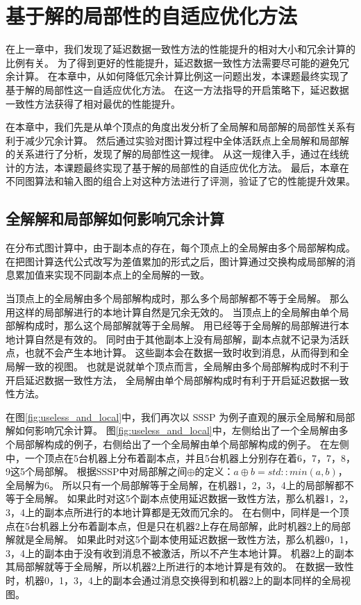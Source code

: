 \chapter{基于解的局部性的自适应优化方法}
在上一章中，我们发现了延迟数据一致性方法的性能提升的相对大小和冗余计算的比例有关。
为了得到更好的性能提升，延迟数据一致性方法需要尽可能的避免冗余计算。
在本章中，从如何降低冗余计算比例这一问题出发，本课题最终实现了基于解的局部性这一自适应优化方法。
在这一方法指导的开启策略下，延迟数据一致性方法获得了相对最优的性能提升。

在本章中，我们先是从单个顶点的角度出发分析了全局解和局部解的局部性关系有利于减少冗余计算。
然后通过实验对图计算过程中全体活跃点上全局解和局部解的关系进行了分析，发现了解的局部性这一规律。
从这一规律入手，通过在线统计的方法，本课题最终实现了基于解的局部性的自适应优化方法。
最后，本章在不同图算法和输入图的组合上对这种方法进行了评测，验证了它的性能提升效果。

\section{全解解和局部解如何影响冗余计算}

在分布式图计算中，由于副本点的存在，每个顶点上的全局解由多个局部解构成。
在把图计算迭代公式改写为差值累加的形式之后，图计算通过交换构成局部解的消息累加值来实现不同副本点上的全局解的一致。

当顶点上的全局解由多个局部解构成时，那么多个局部解都不等于全局解。
那么用这样的局部解进行的本地计算自然是冗余无效的。
当顶点上的全局解由单个局部解构成时，那么这个局部解就等于全局解。
用已经等于全局解的局部解进行本地计算自然是有效的。
同时由于其他副本上没有局部解，副本点就不记录为活跃点，也就不会产生本地计算。
这些副本会在数据一致时收到消息，从而得到和全局解一致的视图。
也就是说就单个顶点而言，全局解由多个局部解构成时不利于开启延迟数据一致性方法，
全局解由单个局部解构成时有利于开启延迟数据一致性方法。


在图\ref{fig:useless_and_local}中，我们再次以 SSSP 为例子直观的展示全局解和局部解如何影响冗余计算。
图\ref{fig:useless_and_local}中，左侧给出了一个全局解由多个局部解构成的例子，右侧给出了一个全局解由单个局部解构成的例子。
在左侧中，一个顶点在5台机器上分布着副本点，并且5台机器上分别存在着6，7，7，8，9这5个局部解。
根据SSSP中对局部解之间$\oplus$的定义：$a\oplus b=std::min(a,b)$，全局解为6。
所以只有一个局部解等于全局解，在机器1，2，3，4上的局部解都不等于全局解。
如果此时对这5个副本点使用延迟数据一致性方法，那么机器1，2，3，4上的副本点所进行的本地计算都是无效而冗余的。
在右侧中，同样是一个顶点在5台机器上分布着副本点，但是只在机器2上存在局部解，此时机器2上的局部解就是全局解。
如果此时对这5个副本使用延迟数据一致性方法，那么机器0，1，3，4上的副本由于没有收到消息不被激活，所以不产生本地计算。
机器2上的副本其局部解就等于全局解，所以机器2上所进行的本地计算是有效的。
在数据一致性时，机器0，1，3，4上的副本会通过消息交换得到和机器2上的副本同样的全局视图。



